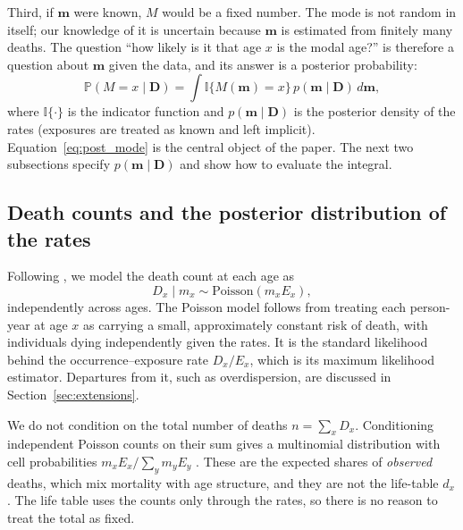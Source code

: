 \documentclass[12pt, letterpaper]{article}
\begin{document}
Third, if $\bm{m}$ were known, $M$ would be a fixed number. The mode is not random in itself; our knowledge of it is uncertain because $\bm{m}$ is estimated from finitely many deaths. The question ``how likely is it that age $x$ is the modal age?'' is therefore a question about $\bm{m}$ given the data, and its answer is a posterior probability:
\begin{equation}
\mathbb{P}(M = x \mid \bm{D}) = \int \mathbb{I}\{M(\bm{m}) = x\} \, p(\bm{m} \mid \bm{D}) \, d\bm{m},
\label{eq:post_mode}
\end{equation}
where $\mathbb{I}\{\cdot\}$ is the indicator function and $p(\bm{m} \mid \bm{D})$ is the posterior density of the rates (exposures are treated as known and left implicit). Equation~\eqref{eq:post_mode} is the central object of the paper. The next two subsections specify $p(\bm{m} \mid \bm{D})$ and show how to evaluate the integral.

\subsection{Death counts and the posterior distribution of the rates}
\label{sec:posterior}

Following \citet{brillinger1986biometrics}, we model the death count at each age as
\begin{equation}
D_x \mid m_x \sim \text{Poisson}(m_x E_x),
\label{eq:poisson}
\end{equation}
independently across ages. The Poisson model follows from treating each person-year at age $x$ as carrying a small, approximately constant risk of death, with individuals dying independently given the rates. It is the standard likelihood behind the occurrence--exposure rate $D_x / E_x$, which is its maximum likelihood estimator. Departures from it, such as overdispersion, are discussed in Section~\ref{sec:extensions}.

We do not condition on the total number of deaths $n = \sum_x D_x$. Conditioning independent Poisson counts on their sum gives a multinomial distribution with cell probabilities $m_x E_x / \sum_y m_y E_y$ \citep[e.g.,][]{bishop2007discrete}. These are the expected shares of \emph{observed} deaths, which mix mortality with age structure, and they are not the life-table $d_x$. The life table uses the counts only through the rates, so there is no reason to treat the total as fixed.
\end{document}
